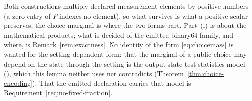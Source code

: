 
Both constructions multiply declared measurement elements by positive numbers
(a zero entry of $P$ indexes no element), so what survives is what a positive
scalar preserves; the choice marginal is where the two forms part. Part~(i) is
about the mathematical products; what is decided of the emitted binary64
family, and where, is Remark~\ref{rem:exactness}. No identity of the form
\eqref{eq:choicemass} is wanted for the setting-dependent form: that the
marginal of a public choice may depend on the state through the setting is
the output-state test-statistics model (), which
this lemma neither uses nor contradicts (Theorem~\ref{thm:choice-encoding}).
That the emitted declaration carries that model is
Requirement~\ref{req:no-fixed-fraction}.

